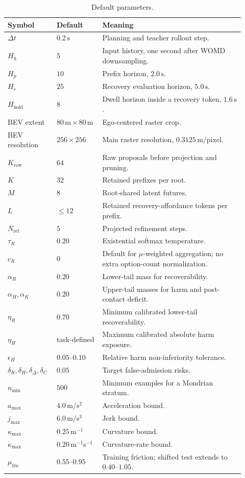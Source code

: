 \documentclass[conference]{IEEEtran}
\begin{document}
\begin{table}[t]
\centering
\footnotesize
\caption{Default parameters.}
\label{tab:default_hyperparameters_new}
\begin{tabular}{p{0.18\linewidth}p{0.16\linewidth}p{0.58\linewidth}}
\toprule
Symbol & Default & Meaning \\
\midrule
$\Delta t$ & $0.2\,\mathrm{s}$ & Planning and teacher rollout step. \\
$H_h$ & $5$ & Input history, one second after WOMD downsampling. \\
$H_p$ & $10$ & Prefix horizon, $2.0\,\mathrm{s}$. \\
$H_r$ & $25$ & Recovery evaluation horizon, $5.0\,\mathrm{s}$. \\
$H_{\mathrm{hold}}$ & $8$ & Dwell horizon inside a recovery token, $1.6\,\mathrm{s}$. \\
BEV extent & $80\,\mathrm{m}\times80\,\mathrm{m}$ & Ego-centered raster crop. \\
BEV resolution & $256\times256$ & Main raster resolution, $0.3125\,\mathrm{m/pixel}$. \\
$K_{\mathrm{raw}}$ & $64$ & Raw proposals before projection and pruning. \\
$K$ & $32$ & Retained prefixes per root. \\
$M$ & $8$ & Root-shared latent futures. \\
$L$ & $\le12$ & Retained recovery-affordance tokens per prefix. \\
$N_{\mathrm{ref}}$ & $5$ & Projected refinement steps. \\
$\tau_R$ & $0.20$ & Existential softmax temperature. \\
$c_R$ & $0$ & Default for $\mu$-weighted aggregation; no extra option-count normalization. \\
$\alpha_R$ & $0.20$ & Lower-tail mass for recoverability. \\
$\alpha_H,\alpha_K$ & $0.20$ & Upper-tail masses for harm and post-contact deficit. \\
$\eta_R$ & $0.70$ & Minimum calibrated lower-tail recoverability. \\
$\eta_H$ & task-defined & Maximum calibrated absolute harm exposure. \\
$\epsilon_H$ & $0.05$--$0.10$ & Relative harm non-inferiority tolerance. \\
$\delta_R,\delta_H,\delta_\Delta,\delta_C$ & $0.05$ & Target false-admission risks. \\
$n_{\min}$ & $500$ & Minimum examples for a Mondrian stratum. \\
$a_{\max}$ & $4.0\,\mathrm{m/s^2}$ & Acceleration bound. \\
$j_{\max}$ & $6.0\,\mathrm{m/s^3}$ & Jerk bound. \\
$\kappa_{\max}$ & $0.25\,\mathrm{m^{-1}}$ & Curvature bound. \\
$\dot\kappa_{\max}$ & $0.20\,\mathrm{m^{-1}s^{-1}}$ & Curvature-rate bound. \\
$\mu_{\mathrm{fric}}$ & $0.55$--$0.95$ & Training friction; shifted test extends to $0.40$--$1.05$. \\
\bottomrule
\end{tabular}
\end{table}




\end{document}
